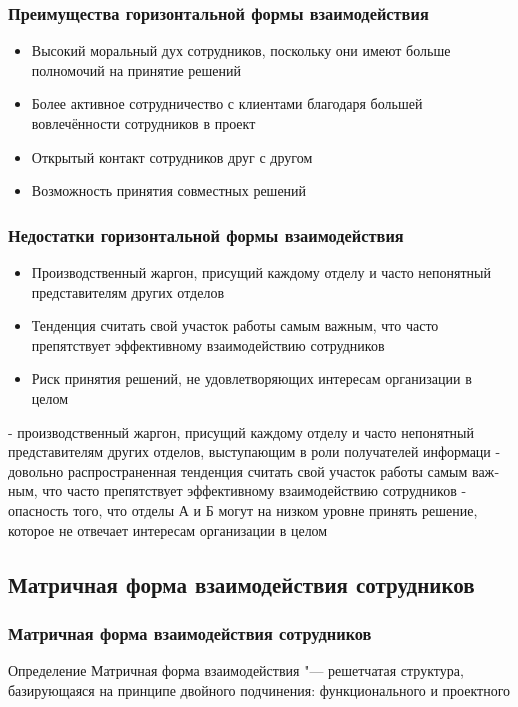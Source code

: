 \documentclass{../industrial-development}
\begin{document}
\begin{frame} \frametitle{Преимущества горизонтальной формы взаимодействия}
  
  \begin{itemize}
  \item Высокий моральный дух сотрудников, поскольку они имеют больше полномочий на принятие решений
  \item Более активное сотрудничество с клиентами благодаря большей вовлечённости сотрудников в проект
  \item Открытый контакт сотрудников друг с другом
  \item Возможность принятия совместных решений
  \end{itemize}
\end{frame}

\begin{frame} \frametitle{Недостатки горизонтальной формы взаимодействия}
	
	\begin{itemize}
		\item Производственный жаргон, присущий каждому отде­лу и часто непонятный представителям других отделов
		\item Тенденция считать свой участок работы самым важ­ным, что часто препятствует эффективному взаимодей­ствию сотрудников
		\item Риск принятия решений, не удовлетворяющих интересам организации в целом
	\end{itemize}
\end{frame}

\lecturenotes
- производственный жаргон, присущий каждому отде­лу и часто непонятный представителям других отделов, вы­ступающим в роли получателей информаци
- довольно распространен­ная тенденция считать свой участок работы самым важ­ным, что часто препятствует эффективному взаимодей­ствию сотрудников
- опасность того, что отделы А и Б могут на низком уровне принять решение, которое не отвечает интересам организации в целом

\subsection{Матричная форма взаимодействия сотрудников}

\begin{frame} \frametitle{Матричная форма взаимодействия сотрудников}
  \begin{block}{Определение}
	\alert{Матричная форма взаимодействия} "--- решетчатая структура, базирующаяся на принципе  двойного подчинения: функционального и проектного
  \end{block}
\end{frame}
\end{document}
